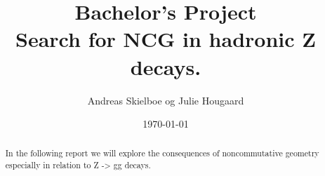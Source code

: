 \documentclass[11pt,a4paper,titlepage]{article}
\numberwithin{equation}{section}
\begin{document}
\title{Bachelor's Project\\Search for NCG in hadronic Z decays.}
\author{Andreas Skielboe og Julie Hougaard}
\date{\today}
\maketitle
{}

\begin{abstract}
In the following report we will explore the consequences of noncommutative geometry especially in relation to Z -> gg decays.
\end{abstract}

\clearpage
\tableofcontents
\clearpage





















\clearpage



\clearpage










\end{document}

